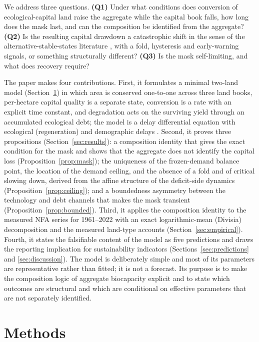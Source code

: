 \documentclass[preprint,12pt,authoryear]{elsarticle}
\begin{document}
We address three questions. \textbf{(Q1)} Under what conditions does conversion of ecological-capital land raise the aggregate while the capital book falls, how long does the mask last, and can the composition be identified from the aggregate? \textbf{(Q2)} Is the resulting capital drawdown a catastrophic shift in the sense of the alternative-stable-states literature \citep{Scheffer2001}, with a fold, hysteresis and early-warning signals, or something structurally different? \textbf{(Q3)} Is the mask self-limiting, and what does recovery require?

The paper makes four contributions. First, it formulates a minimal two-land model (Section~\ref{sec:model}) in which area is conserved one-to-one across three land books, per-hectare capital quality is a separate state, conversion is a rate with an explicit time constant, and degradation acts on the surviving yield through an accumulated ecological debt; the model is a delay differential equation with ecological (regeneration) and demographic delays \citep{Kuang1993,Hutchinson1948}. Second, it proves three propositions (Section~\ref{sec:results}): a composition identity that gives the exact condition for the mask and shows that the aggregate does not identify the capital loss (Proposition~\ref{prop:mask}); the uniqueness of the frozen-demand balance point, the location of the demand ceiling, and the absence of a fold and of critical slowing down, derived from the affine structure of the deficit-side dynamics (Proposition~\ref{prop:ceiling}); and a boundedness asymmetry between the technology and debt channels that makes the mask transient (Proposition~\ref{prop:bounded}). Third, it applies the composition identity to the measured NFA series for 1961--2022 with an exact logarithmic-mean (Divisia) decomposition and the measured land-type accounts (Section~\ref{sec:empirical}). Fourth, it states the falsifiable content of the model as five predictions and draws the reporting implication for sustainability indicators (Sections~\ref{sec:predictions} and \ref{sec:discussion}). The model is deliberately simple and most of its parameters are representative rather than fitted; it is not a forecast. Its purpose is to make the composition logic of aggregate biocapacity explicit and to state which outcomes are structural and which are conditional on effective parameters that are not separately identified.

\section{Methods}\label{sec:model}
\end{document}

